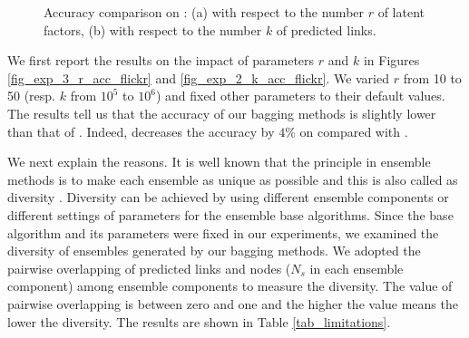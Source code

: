 \begin{figure}[tb!]
  \centering
  \hspace{-2ex}
  \vspace{-1ex}
  \caption{Accuracy comparison on \Flickr: (a) with respect to the number $r$ of latent factors,
  (b) with respect to the number $k$ of predicted links.}\label{fig_exp_5}
  \vspace{-1ex}
\end{figure}

We first report the results on the impact of parameters $r$ and $k$
in Figures \ref{fig_exp_3_r_acc_flickr} and \ref{fig_exp_2_k_acc_flickr}.
We varied $r$ from 10 to 50 (resp. $k$ from $10^5$ to $10^6$)
and fixed other parameters to their default values. The results tell us that
the accuracy of our bagging methods is slightly lower than that of \NMF.
Indeed, \Biased decreases the accuracy by $4\%$ on \Flickr compared with \NMF.

We next explain the reasons. It is well known that the principle in ensemble methods is to make each ensemble as
unique as possible and this is also called as diversity \cite{zhzhou}. Diversity can
be achieved by using different ensemble components or different settings of parameters for the ensemble base
algorithms. Since the base algorithm and its parameters were fixed in our experiments, we examined
the diversity of ensembles generated by our bagging methods. We adopted the pairwise
overlapping of predicted links and nodes (\ie $N_s$ in each ensemble component)
among ensemble components to measure the diversity. The value of pairwise overlapping is between
zero and one and the higher the value means the lower the diversity.
The results are shown in Table \ref{tab_limitations}.

